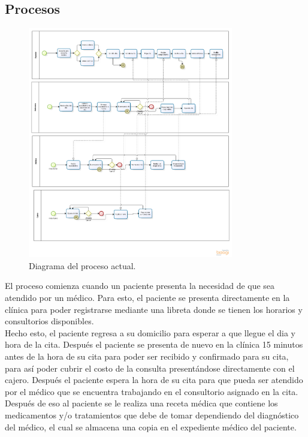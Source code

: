 \subsection{Procesos}

\begin{figure}[htbp!]
		\centering
			\includegraphics[width=0.8\textwidth]{images/Proceso_actual}
		\caption{Diagrama del proceso actual.}
	\end{figure}

El proceso comienza cuando un paciente presenta la necesidad de que sea atendido por un médico. Para esto, el paciente se presenta directamente en la clínica para poder registrarse mediante una libreta donde se tienen los horarios y consultorios disponibles.\\

Hecho esto, el paciente regresa a su domicilio para esperar a que llegue el dia y hora de la cita. Después el paciente se presenta de nuevo en la clínica 15 minutos antes de la hora de su cita para poder ser recibido y confirmado para su cita, para así poder cubrir el costo de la consulta presentándose directamente con el cajero. Después el paciente espera la hora de su cita para que pueda ser atendido por el médico que se encuentra trabajando en el consultorio asignado en la cita.\\

Después de eso al paciente se le realiza una receta médica que contiene los medicamentos y/o tratamientos que debe de tomar dependiendo del diagnóstico del médico, el cual se almacena una copia en el expediente médico del paciente.\\ 

